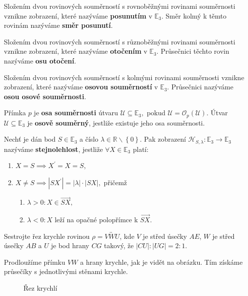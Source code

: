 \begin{definition}
    Složením dvou rovinových souměrností s rovnoběžnými rovinami souměrnosti vznikne
    zobrazení, které nazýváme \textbf{posunutím} v $\mathbb E_3.$ Směr kolmý k těmto
    rovinám nazýváme \textbf{směr posunutí}.
\end{definition}

\begin{definition}
    Složením dvou rovinových souměrností s různoběžnými rovinami souměrnosti vznikne
    zobrazení, které nazýváme \textbf{otočením} v $\mathbb E_3.$ Průsečnici těchto
    rovin nazýváme \textbf{osu otočení}.
\end{definition}

\begin{definition}
    Složením dvou rovinových souměrností s kolmými rovinami souměrnosti vznikne zobrazení, které nazýváme \textbf{osovou souměrností} v $\mathbb E_3$. Průsečnici nazýváme \textbf{osou osové souměrnosti}.
\end{definition}

\begin{definition}
Přímka $p$ je \textbf{osa souměrnosti} útvaru $\mathscr U \subseteq \mathbb E_3,$
pokud $\mathscr U = \mathscr O_p(\mathscr U)$. Útvar $\mathscr U \subseteq \mathbb E_3$ je \textbf{osově souměrný}, jestliže existuje jeho osa souměrnosti.
\end{definition}

\begin{definition}
    Nechť je dán bod $S\in \mathbb E_3$ a číslo $\lambda \in \mathbb R \smallsetminus \left \{ 0
    \right \}. $ Pak zobrazení $\mathscr H_{S,\lambda}\colon \mathbb E_3 \to \mathbb E_3$
   nazýváme \textbf{stejnolehlost}, jestliže $\forall X \in \mathbb E_3$ platí:
   \begin{enumerate}[$i.$]
   \item $X=S\implies X^\prime =X=S$,
  	\item $X\ne S\implies |SX^\prime| = |\lambda|\cdot |SX|,$ přičemž
   \begin{enumerate}[$a.$]
   \item $\lambda > 0\colon X\in \overrightarrow{SX},$
  	\item $\lambda < 0\colon X$ leží na opačné polopřímce k $\overrightarrow{SX}.$
   \end{enumerate}
   \end{enumerate}
\end{definition}

\begin{priklad}
Sestrojte řez krychle rovinou $\rho=\overleftrightarrow{VWU}$, kde $V$ je střed
úsečky $AE$, $W$ je střed úsečky $AB$ a $U$ je bod hrany $CG$ takový, že $|CU|:|UG|=2:1$.
\end{priklad}

\begin{reseni}
Prodloužíme přímku $VW$ a hrany krychle, jak je vidět na obrázku. Tím získáme průsečíky s jednotlivými stěnami
krychle.
\begin{figure}[h]
	\centering
	\caption{Řez krychlí}
\end{figure}
\end{reseni}
